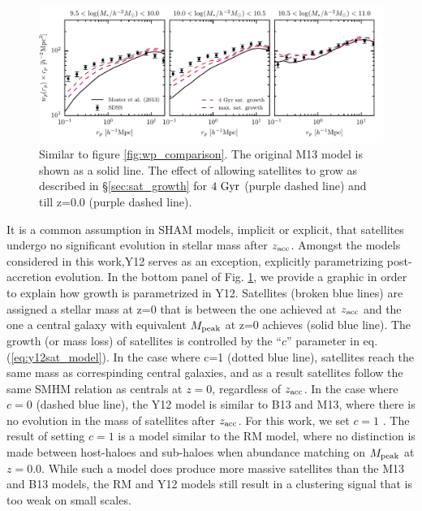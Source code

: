 \documentclass[a4paper,fleqn,usenatbib]{mnras}
\begin{document}
\begin{figure}
    \label{fig:sat_growth_model}
\end{figure}

\begin{figure}
    \includegraphics{figures/wp_sat_growth_comparison.pdf}
    \caption{Similar to figure \ref{fig:wp_comparison}.  The original M13 model is shown as a solid line.  The effect of allowing satellites to grow as described in \S \ref{sec:sat_growth} for $4~{\rm Gyr}$ (purple dashed line) and till z=0.0 (purple dashed line).}
    \label{fig:wp_effect_comparison_sat_growth}
\end{figure}

It is a common assumption in SHAM models, implicit or explicit, that satellites undergo no significant evolution in stellar mass after $z_{\rm acc}$.  Amongst the models considered in this work,Y12 serves as an exception, explicitly parametrizing post-accretion evolution.  In the bottom panel of Fig. \ref{fig:sat_growth_model}, we provide a graphic in order to explain how growth is parametrized in Y12.  Satellites (broken blue lines) are assigned a stellar mass at z=0 that is between the one achieved at $z_{\rm acc}$ and the one a central galaxy with equivalent $M_{\rm peak}$ at z=0 achieves (solid blue line).  The growth (or mass loss) of satellites is controlled by the ``$c$'' parameter in eq. (\ref{eq:y12sat_model}).  In the case where c=1 (dotted blue line), satellites reach the same mass as correspinding central galaxies, and as a result satellites follow the same SMHM relation as centrals at $z=0$, regardless of $z_{\rm acc}$.  In the case where $c=0$ (dashed blue line), the Y12 model is similar to B13 and M13, where there is no evolution in the mass of satellites after $z_{\rm acc}$.  For this work, we set $c = 1$ \citep[consistent with SMF2 FIT-2PCF in table 4 in][]{Yang:2012ew}.  The result of setting $c = 1$ is a model similar to the RM model, where no distinction is made between host-haloes and sub-haloes when abundance matching on $M_{\rm peak}$ at $z=0.0$.  While such a model does produce more massive satellites than the M13 and B13 models, the RM and Y12 models still result in a clustering signal that is too weak on small scales.
\end{document}
